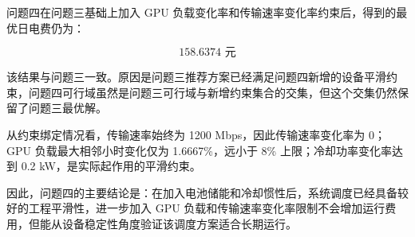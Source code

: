 \documentclass[
]{article}
\begin{document}
问题四在问题三基础上加入 GPU
负载变化率和传输速率变化率约束后，得到的最优日电费仍为：

\[158.6374\text{ 元}\]

该结果与问题三一致。原因是问题三推荐方案已经满足问题四新增的设备平滑约束，问题四可行域虽然是问题三可行域与新增约束集合的交集，但这个交集仍然保留了问题三最优解。

从约束绑定情况看，传输速率始终为 1200 Mbps，因此传输速率变化率为 0；GPU
负载最大相邻小时变化仅为 1.6667\%，远小于 8\% 上限；冷却功率变化率达到
0.2 kW，是实际起作用的平滑约束。

因此，问题四的主要结论是：在加入电池储能和冷却惯性后，系统调度已经具备较好的工程平滑性，进一步加入
GPU
负载和传输速率变化率限制不会增加运行费用，但能从设备稳定性角度验证该调度方案适合长期运行。
\end{document}
